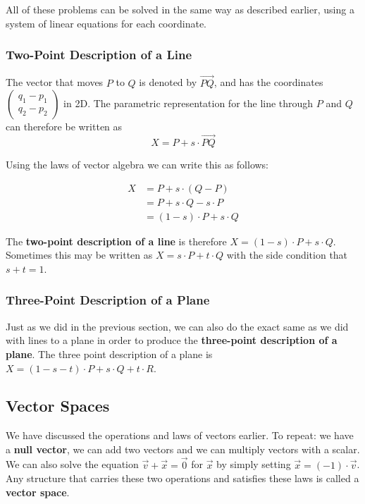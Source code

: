 \documentclass{article}
\begin{document}
	All of these problems can be solved in the same way as described earlier, using a system of linear equations for each coordinate.
	
	\subsubsection{Two-Point Description of a Line}
	The vector that moves $P$ to $Q$ is denoted by $\overrightarrow{PQ}$, and has the coordinates $\left( \begin{array}{c} q_{1} - p_{1} \\ q_{2} - p_{2} \end{array} \right)$ in 2D. The parametric representation for the line through $P$ and $Q$ can therefore be written as 
	\[ X = P + s \cdot \overrightarrow{PQ} \]
	
	Using the laws of vector algebra we can write this as follows:
	
	\begin{align*}
		X &= P + s \cdot (Q - P)\\
		  &= P + s \cdot Q - s \cdot P\\
		  &= (1 - s) \cdot P + s \cdot Q
	\end{align*}
	
	The \textbf{two-point description of a line} is therefore $X = (1 - s) \cdot P + s \cdot Q$. Sometimes this may be written as $X = s \cdot P + t \cdot Q$ with the side condition that $s + t = 1$.
	
	\subsubsection{Three-Point Description of a Plane}
	Just as we did in the previous section, we can also do the exact same as we did with lines to a plane in order to produce the \textbf{three-point description of a plane}. The three point description of a plane is $X = (1 - s - t) \cdot P + s \cdot Q + t \cdot R$.
	
	\subsection{Vector Spaces}
	We have discussed the operations and laws of vectors earlier. To repeat: we have a \textbf{null vector}, we can add two vectors and we can multiply vectors with a scalar. We can also solve the equation $\overrightarrow{v} + \overrightarrow{x} = \overrightarrow{0}$ for $\overrightarrow{x}$ by simply setting $\overrightarrow{x} = (-1) \cdot \overrightarrow{v}$. Any structure that carries these two operations and satisfies these laws is called a \textbf{vector space}. 
	
\end{document}
